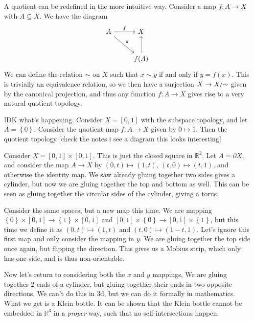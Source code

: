 
A quotient can be redefined in the more intuitive way. Consider a map $f : A \to X$ with $A\subseteq X$. We have the diagram
\[\begin{tikzcd}[row sep = 2.5em, column sep = 2.5em]
	A\arrow[r, "f"]\arrow[dr, "\pi "]&X\\
					 &f(A)\arrow[u]
\end{tikzcd}\]
We can define the relation $\sim $ on $X$ such that $x\sim y$ if and only if $y=f(x)$. This is trivially an equivalence relation, so we then have a surjection $X \to X/\mathbin{\sim}$ given by the canonical projection, and thus any function $f : A \to X$ gives rise to a very natural quotient topology.

IDK what's happening. Consider $X=[0,1]$ with the subspace topology, and let $A=\left\{ 0 \right\} $. Consider the quotient map $f : A \to X$ given by $0\mapsto 1$. Then the quotient topology [check the notes i see a diagram this looks interesting]

Consider $X=[0,1]\times [0,1]$. This is just the closed square in $\mathbb{R} ^2$. Let $A=\partial X$, and consider the map $A\to X$ by $(0,t)\mapsto (1,t)$, $(t,0)\mapsto (t,1)$, and otherwise the identity map. We saw already gluing together two sides gives a cylinder, but now we are gluing together the top and bottom as well. This can be seen as gluing together the circular sides of the cylinder, giving a torus.

Consider the same spaces, but a new map this time. We are mapping $\left\{ 0 \right\} \times [0,1]\to \left\{ 1 \right\} \times [0,1]$ and $[0,1]\times \left\{ 0 \right\} \to [0,1]\times \left\{ 1 \right\} $, but this time we define it as $(0,t)\mapsto (1,t)$ and $(t,0)\mapsto (1-t,1)$. Let's ignore this first map and only consider the mapping in $y$. We are gluing together the top side once again, but flipping the direction. This gives us a Mobius strip, which only has one side, and is thus non-orientable.

Now let's return to considering both the $x$ and $y$ mappings, We are gluing together 2 ends of a cylinder, but gluing together their ends in two opposite directions. We can't do this in 3d, but we can do it formally in mathematics. What we get is a Klein bottle. It can be shown that the Klein bottle cannot be embedded in $\mathbb{R} ^3$ in a \emph{proper} way, such that no self-intersections happen.

